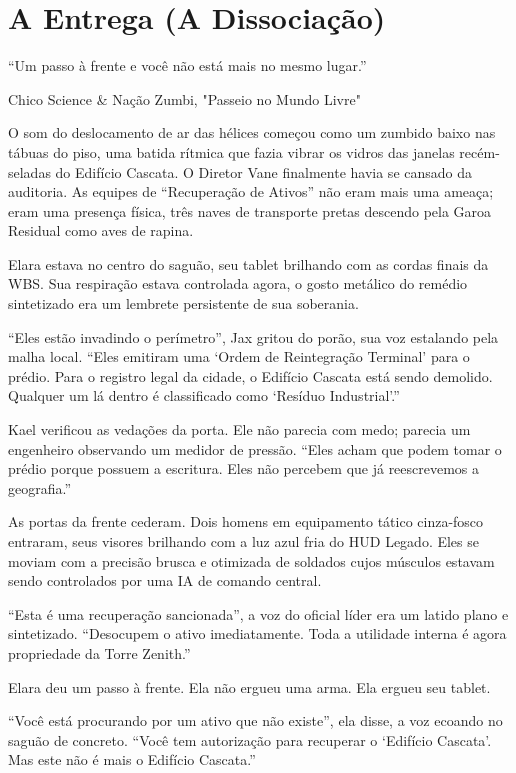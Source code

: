 
\chapter{A Entrega (A Dissociação)}
\epigraph{``Um passo à frente e você não está mais no mesmo lugar.''}{Chico Science \& Nação Zumbi, "Passeio no Mundo Livre"}

O som do deslocamento de ar das hélices começou como um zumbido baixo nas tábuas do piso, uma batida rítmica que fazia vibrar os vidros das janelas recém-seladas do Edifício Cascata. O Diretor Vane finalmente havia se cansado da auditoria. As equipes de ``Recuperação de Ativos'' não eram mais uma ameaça; eram uma presença física, três naves de transporte pretas descendo pela Garoa Residual como aves de rapina.

Elara estava no centro do saguão, seu tablet brilhando com as cordas finais da WBS. Sua respiração estava controlada agora, o gosto metálico do remédio sintetizado era um lembrete persistente de sua soberania.

``Eles estão invadindo o perímetro'', Jax gritou do porão, sua voz estalando pela malha local. ``Eles emitiram uma `Ordem de Reintegração Terminal' para o prédio. Para o registro legal da cidade, o Edifício Cascata está sendo demolido. Qualquer um lá dentro é classificado como `Resíduo Industrial'.''

Kael verificou as vedações da porta. Ele não parecia com medo; parecia um engenheiro observando um medidor de pressão. ``Eles acham que podem tomar o prédio porque possuem a escritura. Eles não percebem que já reescrevemos a geografia.''

As portas da frente cederam. Dois homens em equipamento tático cinza-fosco entraram, seus visores brilhando com a luz azul fria do HUD Legado. Eles se moviam com a precisão brusca e otimizada de soldados cujos músculos estavam sendo controlados por uma IA de comando central.

``Esta é uma recuperação sancionada'', a voz do oficial líder era um latido plano e sintetizado. ``Desocupem o ativo imediatamente. Toda a utilidade interna é agora propriedade da Torre Zenith.''

Elara deu um passo à frente. Ela não ergueu uma arma. Ela ergueu seu tablet.

``Você está procurando por um ativo que não existe'', ela disse, a voz ecoando no saguão de concreto. ``Você tem autorização para recuperar o `Edifício Cascata'. Mas este não é mais o Edifício Cascata.''


